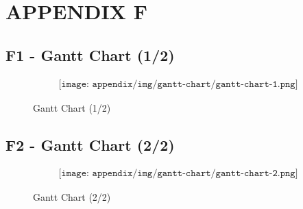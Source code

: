 \section{APPENDIX F} \label{sec:appF}

\subsection*{F1 - Gantt Chart (1/2)}

\begin{figure}[H]
    \begin{align*}
        \texttt{[image: appendix/img/gantt-chart/gantt-chart-1.png]}
    \end{align*}
    \caption{Gantt Chart (1/2)}
    \label{fig:gantt-chart-1}
\end{figure}

\subsection*{F2 - Gantt Chart (2/2)}

\begin{figure}[H]
    \begin{align*}
        \texttt{[image: appendix/img/gantt-chart/gantt-chart-2.png]}
    \end{align*}
    \caption{Gantt Chart (2/2)}
    \label{fig:gantt-chart-2}
\end{figure}
